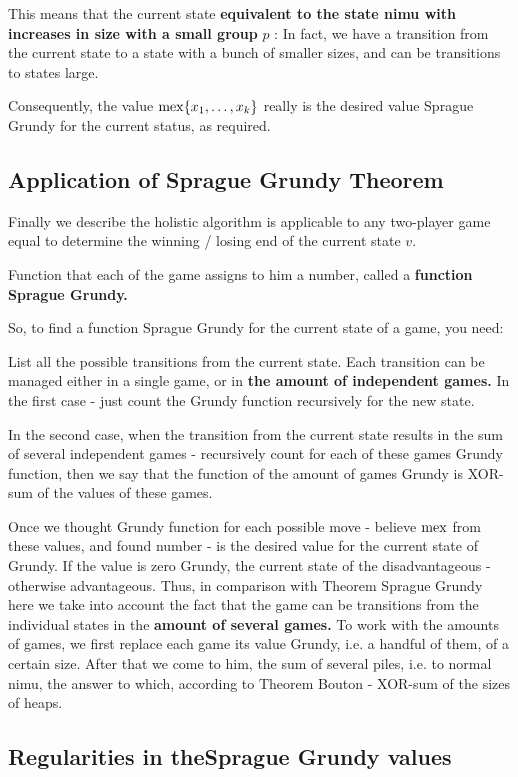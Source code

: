 This means that the current state \textbf{equivalent to the state nimu with increases in size with a small group} \textbf{$p$} : In fact, we have a transition from the current state to a state with a bunch of smaller sizes, and can be transitions to states large.

Consequently, the value ${\rm mex} \{x_1, \ldots, x_k \}$ really is the desired value Sprague Grundy for the current status, as required.

\subsection{ Application of Sprague Grundy Theorem  }

Finally we describe the holistic algorithm is applicable to any two-player game equal to determine the winning / losing end of the current state $v$.

Function that each of the game assigns to him a number, called a \textbf{function Sprague Grundy.}

So, to find a function Sprague Grundy for the current state of a game, you need:

List all the possible transitions from the current state.
Each transition can be managed either in a single game, or in \textbf{the amount of independent games.}
In the first case - just count the Grundy function recursively for the new state.

In the second case, when the transition from the current state results in the sum of several independent games - recursively count for each of these games Grundy function, then we say that the function of the amount of games Grundy is XOR-sum of the values ​​of these games.

Once we thought Grundy function for each possible move - believe $\rm mex$ from these values, and found number - is the desired value for the current state of Grundy.
If the value is zero Grundy, the current state of the disadvantageous - otherwise advantageous.
Thus, in comparison with Theorem Sprague Grundy here we take into account the fact that the game can be transitions from the individual states in the \textbf{amount of several games.} To work with the amounts of games, we first replace each game its value Grundy, i.e. a handful of them, of a certain size. After that we come to him, the sum of several piles, i.e. to normal nimu, the answer to which, according to Theorem Bouton - XOR-sum of the sizes of heaps.

\subsection{ Regularities in the ​​Sprague Grundy values  }

